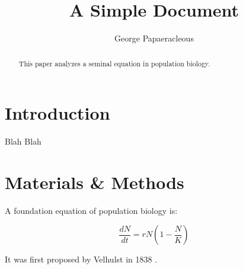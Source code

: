 \documentclass[12pt]{article}
\title{A Simple Document}
\author{George Papaeracleous}
\date{}
\begin{document}
  \maketitle

  \begin{abstract}
    This paper analyzes a seminal equation in population biology.
  \end{abstract}

  \section{Introduction}
    Blah Blah

  \section{Materials \& Methods}
  A foundation equation of population biology is:

  \begin{equation}
    \frac{dN}{dt} = rN (1 - \frac{N}{K})
  \end{equation}

  It was first proposed by Velhulst in 1838 \cite{verhulst1838notice}.

  

  
\end{document}

